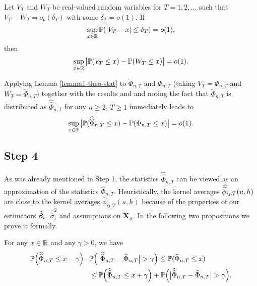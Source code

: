 \documentclass[a4paper,12pt]{article}
\makeatletter
\renewcommand{\eqref}[1]{\tagform@{\ref{#1}}}
\newcommand{\doublehat}[1]{\skew{5.5}\widehat{\widehat{#1}}}
\newcommand{\doublehattwo}[1]{\widehat{\widehat{#1}}}
\makeatother
\begin{document}
\begin{lemmaA}{\cite{KhismatullinaVogt2020}}\label{lemma1-theo-stat}
Let $V_T$ and $W_T$ be real-valued random variables for $T = 1,2,\ldots$ such that $V_T - W_T = o_p(\delta_T)$ with some $\delta_T = o(1)$. If 
\begin{equation*}
\sup_{x \in \mathbb{R}} \mathbb{P}(|V_T - x| \le \delta_T) = o(1), 
\end{equation*}
then 
\begin{equation*}
\sup_{x \in \mathbb{R}} \big| \mathbb{P}(V_T \le x) - \mathbb{P}(W_T \le x) \big| = o(1). 
\end{equation*}
\end{lemmaA}

Applying Lemma \ref{lemma1-theo-stat} to $\widetilde{\Phi}_{n, T}$ and $\Phi_{n,T}$ (taking $V_T = \Phi_{n,T}$ and $W_T = \widetilde{\Phi}_{n, T}$) together with the results \eqref{eq-strong-approx-equality} and \eqref{eqA:anticon} and noting the fact that $\widetilde{\Phi}_{n, T}$ is distributed as $\doublehattwo{\Phi}_{n, T}$ for any $n \ge 2$, $T \ge 1$ immediately leads to
\begin{equation}\label{eqA:intermediate:gaussian}
\sup_{x \in \reals} \big| \pr(\doublehattwo{\Phi}_{n, T} \le x) - \pr(\Phi_{n,T} \le x) \big| = o(1). 
\end{equation}

\subsection*{Step 4}


As was already mentioned in Step 1, the statistics $\doublehattwo{\Phi}_{n,T}$ can be viewed as an approximation of the statistics $\widehat{\Phi}_{n,T}$. Heuristically, the kernel averages $\doublehat{\phi}_{ij,T}(u,h)$ are close to the kernel averages $\widehat{\phi}_{ij,T}(u,h)$ because of the properties of our estimators $\widehat{\bm{\beta}}_i$, $\doublehattwo{\sigma}_i^2$ and assumptions on $\mathbf{X}_{it}$. In the following two propositions we prove it formally.

\begin{propA}\label{propA:intermediate1}
For any $x \in \mathbb{R}$ and any $\gamma > 0$, we have
\begin{align}\label{eq-intermediate-relation-1}
\begin{split}\pr\Big(\doublehattwo{\Phi}_{n,T} \le x - \gamma\Big) -& \pr \Big(\big|\doublehattwo{\Phi}_{n,T} - \widehat{\Phi}_{n,T}\big| > \gamma \Big)\le \pr(\widehat{\Phi}_{n, T} \le x) \\
&\le\pr\Big(\doublehattwo{\Phi}_{n,T} \le x + \gamma\Big) + \pr \Big(\big|\doublehattwo{\Phi}_{n,T} - \widehat{\Phi}_{n,T}\big| > \gamma \Big).
\end{split}
\end{align}
\end{propA}
\end{document}
